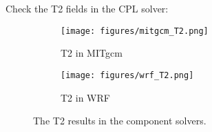 
Check the T2 fields in the CPL solver:

\begin{figure}[h!]
\centering
  \begin{subfigure}[b]{0.4\linewidth}
  \texttt{[image: figures/mitgcm\_T2.png]}
  \caption{T2 in MITgcm}
  \end{subfigure}
  \begin{subfigure}[b]{0.4\linewidth}
  \texttt{[image: figures/wrf\_T2.png]}
  \caption{T2 in WRF}
  \end{subfigure}
\caption{The T2 results in the component solvers.}
\label{fig:t2}
\end{figure}
